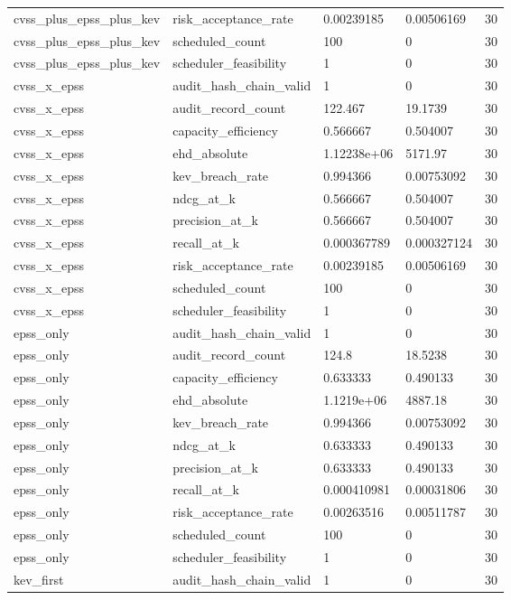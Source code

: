 \begin{tabular}{l l l l l}
cvss\_plus\_epss\_plus\_kev & risk\_acceptance\_rate & 0.00239185 & 0.00506169 & 30 \\
cvss\_plus\_epss\_plus\_kev & scheduled\_count & 100 & 0 & 30 \\
cvss\_plus\_epss\_plus\_kev & scheduler\_feasibility & 1 & 0 & 30 \\
cvss\_x\_epss & audit\_hash\_chain\_valid & 1 & 0 & 30 \\
cvss\_x\_epss & audit\_record\_count & 122.467 & 19.1739 & 30 \\
cvss\_x\_epss & capacity\_efficiency & 0.566667 & 0.504007 & 30 \\
cvss\_x\_epss & ehd\_absolute & 1.12238e+06 & 5171.97 & 30 \\
cvss\_x\_epss & kev\_breach\_rate & 0.994366 & 0.00753092 & 30 \\
cvss\_x\_epss & ndcg\_at\_k & 0.566667 & 0.504007 & 30 \\
cvss\_x\_epss & precision\_at\_k & 0.566667 & 0.504007 & 30 \\
cvss\_x\_epss & recall\_at\_k & 0.000367789 & 0.000327124 & 30 \\
cvss\_x\_epss & risk\_acceptance\_rate & 0.00239185 & 0.00506169 & 30 \\
cvss\_x\_epss & scheduled\_count & 100 & 0 & 30 \\
cvss\_x\_epss & scheduler\_feasibility & 1 & 0 & 30 \\
epss\_only & audit\_hash\_chain\_valid & 1 & 0 & 30 \\
epss\_only & audit\_record\_count & 124.8 & 18.5238 & 30 \\
epss\_only & capacity\_efficiency & 0.633333 & 0.490133 & 30 \\
epss\_only & ehd\_absolute & 1.1219e+06 & 4887.18 & 30 \\
epss\_only & kev\_breach\_rate & 0.994366 & 0.00753092 & 30 \\
epss\_only & ndcg\_at\_k & 0.633333 & 0.490133 & 30 \\
epss\_only & precision\_at\_k & 0.633333 & 0.490133 & 30 \\
epss\_only & recall\_at\_k & 0.000410981 & 0.00031806 & 30 \\
epss\_only & risk\_acceptance\_rate & 0.00263516 & 0.00511787 & 30 \\
epss\_only & scheduled\_count & 100 & 0 & 30 \\
epss\_only & scheduler\_feasibility & 1 & 0 & 30 \\
kev\_first & audit\_hash\_chain\_valid & 1 & 0 & 30 \\

\end{tabular}

